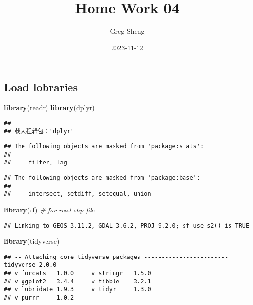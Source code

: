 \documentclass[
]{article}
\title{Home Work 04}
\author{Greg Sheng}
\date{2023-11-12}
\newenvironment{Shaded}{\begin{snugshade}}{\end{snugshade}}
\newcommand{\CommentTok}[1]{\textcolor[rgb]{0.56,0.35,0.01}{\textit{#1}}}
\newcommand{\FunctionTok}[1]{\textcolor[rgb]{0.13,0.29,0.53}{\textbf{#1}}}
\newcommand{\NormalTok}[1]{#1}
\begin{document}
\maketitle

\hypertarget{load-lobraries}{%
\subsection{Load lobraries}\label{load-lobraries}}

\begin{Shaded}
\begin{Highlighting}[]
\FunctionTok{library}\NormalTok{(readr)}
\FunctionTok{library}\NormalTok{(dplyr)}
\end{Highlighting}
\end{Shaded}

\begin{verbatim}
## 
## 载入程辑包：'dplyr'
\end{verbatim}

\begin{verbatim}
## The following objects are masked from 'package:stats':
## 
##     filter, lag
\end{verbatim}

\begin{verbatim}
## The following objects are masked from 'package:base':
## 
##     intersect, setdiff, setequal, union
\end{verbatim}

\begin{Shaded}
\begin{Highlighting}[]
\FunctionTok{library}\NormalTok{(sf)  }\CommentTok{\# for read shp file}
\end{Highlighting}
\end{Shaded}

\begin{verbatim}
## Linking to GEOS 3.11.2, GDAL 3.6.2, PROJ 9.2.0; sf_use_s2() is TRUE
\end{verbatim}

\begin{Shaded}
\begin{Highlighting}[]
\FunctionTok{library}\NormalTok{(tidyverse)}
\end{Highlighting}
\end{Shaded}

\begin{verbatim}
## -- Attaching core tidyverse packages ------------------------ tidyverse 2.0.0 --
## v forcats   1.0.0     v stringr   1.5.0
## v ggplot2   3.4.4     v tibble    3.2.1
## v lubridate 1.9.3     v tidyr     1.3.0
## v purrr     1.0.2
\end{verbatim}
\end{document}
